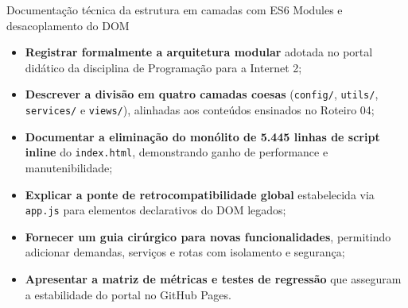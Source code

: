 \newcommand{\numeroRoteiro}{DOC}
\newcommand{\tituloCurto}{Arquitetura Modular \& Estrutura do Portal}




  {Documentação técnica da estrutura em camadas com ES6 Modules e desacoplamento do DOM}
  {\hspace{4pt}%
   \hspace{4pt}%
   \hspace{4pt}%
   }

\vspace{0.4em}

\begin{boxObjetivos}
\begin{itemize}
  \item \textbf{Registrar formalmente a arquitetura modular} adotada no portal didático da disciplina de Programação para a Internet 2;
  \item \textbf{Descrever a divisão em quatro camadas coesas} (\texttt{config/}, \texttt{utils/}, \texttt{services/} e \texttt{views/}), alinhadas aos conteúdos ensinados no Roteiro 04;
  \item \textbf{Documentar a eliminação do monólito de 5.445 linhas de script inline} do \texttt{index.html}, demonstrando ganho de performance e manutenibilidade;
  \item \textbf{Explicar a ponte de retrocompatibilidade global} estabelecida via \texttt{app.js} para elementos declarativos do DOM legados;
  \item \textbf{Fornecer um guia cirúrgico para novas funcionalidades}, permitindo adicionar demandas, serviços e rotas com isolamento e segurança;
  \item \textbf{Apresentar a matriz de métricas e testes de regressão} que asseguram a estabilidade do portal no GitHub Pages.
\end{itemize}
\end{boxObjetivos}

